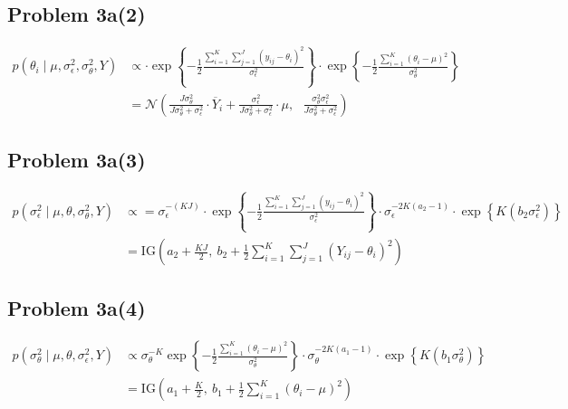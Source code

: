 \documentclass[12pt, letterpaper]{article}
\begin{document}
\subsection*{Problem 3a(2)} 
\begin{align*}
p(\theta_i \mid \mu, \sigma^2_\epsilon, \sigma^2_\theta, Y) & \propto 
\cdot \exp \left\{ - \frac{1}{2} \frac{\sum_{i=1}^K \sum_{j=1}^J (y_{ij}  - \theta_i)^2}
{\sigma^2_\epsilon} \right\}  \cdot 
\exp \left\{ - \frac{1}{2} \frac{\sum_{i=1}^K (\theta_i - \mu)^2}
{\sigma^2_\theta } \right\} 
\\[0.5ex]
& =  \mathcal{N} \left( 
\frac{J\sigma^2_\theta}{J\sigma^2_\theta + \sigma_\epsilon^2} \cdot \overline{Y}_i
+ 
\frac{\sigma^2_\epsilon}{J\sigma^2_\theta + \sigma_\epsilon^2} \cdot \mu
, \ \ \ 
\frac{\sigma^2_\theta \sigma^2_\epsilon}{J\sigma^2_\theta + \sigma_\epsilon^2}
\right) 
\end{align*}

\subsection*{Problem 3a(3)}
\begin{align*} 
p(\sigma^2_\epsilon \mid \mu, \theta, \sigma^2_\theta, Y)   & \propto 
 = 
\sigma_\epsilon^{-(KJ)} \cdot \exp \left\{ - \frac{1}{2} \frac{\sum_{i=1}^K \sum_{j=1}^J (y_{ij}  - \theta_i)^2}
{\sigma^2_\epsilon} \right\}  
 \cdot 
\sigma_\epsilon^{-2K(a_2 - 1)} \cdot 
\exp \left\{ K \left( 
 b_2 \sigma^2_\epsilon 
\right) \right\} 
\\[0.5ex]
& =\text{IG}
\left(
a_2 + \frac{KJ}{2}, \ 
b_2 + \frac{1}{2} \sum_{i=1}^K \sum_{j=1}^J (Y_{ij} - \theta_i)^2
\right)
\end{align*} 

\subsection*{Problem 3a(4)} 
\begin{align*}
p(\sigma^2_\theta \mid \mu, \theta, \sigma^2_\epsilon, Y)  & \propto 
\sigma_\theta^{-K} \exp \left\{ - \frac{1}{2} \frac{\sum_{i=1}^K (\theta_i - \mu)^2}
{\sigma^2_\theta } \right\} 
 \cdot  
\sigma_\theta^{-2K(a_1 - 1)} \cdot 
\exp \left\{ K \left( 
 b_1 \sigma^2_\theta 
\right) \right\} 
\\[0.5ex]
& = \text{IG}
\left(
a_1 + \frac{K}{2}
, \ 
b_1 + \frac{1}{2} \sum_{i=1}^K  (\theta_i - \mu)^2
\right)
\end{align*}

 
\end{document}
